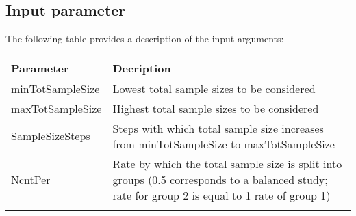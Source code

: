 \documentclass[]{article}
\begin{document}
\newpage

\subsection{Input parameter}\label{input-parameter}

The following table provides a description of the input arguments:

\begin{longtable}[]{@{}ll@{}}
\toprule
\begin{minipage}[b]{0.18\columnwidth}\raggedright\strut
Parameter\strut
\end{minipage} & \begin{minipage}[b]{0.76\columnwidth}\raggedright\strut
Decription\strut
\end{minipage}\tabularnewline
\midrule
\endhead
\begin{minipage}[t]{0.18\columnwidth}\raggedright\strut
minTotSampleSize\strut
\end{minipage} & \begin{minipage}[t]{0.76\columnwidth}\raggedright\strut
Lowest total sample sizes to be considered\strut
\end{minipage}\tabularnewline
\begin{minipage}[t]{0.18\columnwidth}\raggedright\strut
maxTotSampleSize\strut
\end{minipage} & \begin{minipage}[t]{0.76\columnwidth}\raggedright\strut
Highest total sample sizes to be considered\strut
\end{minipage}\tabularnewline
\begin{minipage}[t]{0.18\columnwidth}\raggedright\strut
SampleSizeSteps\strut
\end{minipage} & \begin{minipage}[t]{0.76\columnwidth}\raggedright\strut
Steps with which total sample size increases from minTotSampleSize to
maxTotSampleSize\strut
\end{minipage}\tabularnewline
\begin{minipage}[t]{0.18\columnwidth}\raggedright\strut
NcntPer\strut
\end{minipage} & \begin{minipage}[t]{0.76\columnwidth}\raggedright\strut
Rate by which the total sample size is split into groups (0.5
corresponds to a balanced study; rate for group 2 is equal to 1 rate of
group 1)\strut
\end{minipage}\tabularnewline
\begin{minipage}[t]{0.18\columnwidth}\raggedright\strut

\end{minipage}
\end{longtable}
\end{document}
